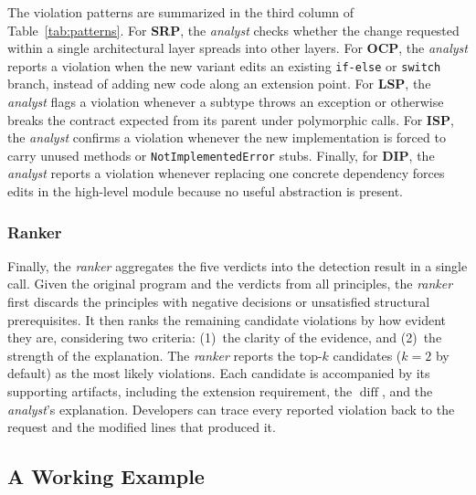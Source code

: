 \documentclass[sigconf,screen]{acmart}
\begin{document}
The violation patterns are summarized in the third column of Table~\ref{tab:patterns}.
For \textbf{SRP}, the \textit{analyst} checks whether the change requested within a single architectural layer spreads into other layers.
For \textbf{OCP}, the \textit{analyst} reports a violation when the new variant edits an existing \texttt{if-else} or \texttt{switch} branch, instead of adding new code along an extension point.
For \textbf{LSP}, the \textit{analyst} flags a violation whenever a subtype throws an exception or otherwise breaks the contract expected from its parent under polymorphic calls.
For \textbf{ISP}, the \textit{analyst} confirms a violation whenever the new implementation is forced to carry unused methods or \texttt{NotImplementedError} stubs.
Finally, for \textbf{DIP}, the \textit{analyst} reports a violation whenever replacing one concrete dependency forces edits in the high-level module because no useful abstraction is present.

\subsubsection{Ranker}
Finally, the \textit{ranker} aggregates the five verdicts into the detection result in a single call.
Given the original program and the verdicts from all principles, the \textit{ranker} first discards the principles with negative decisions or unsatisfied structural prerequisites.
It then ranks the remaining candidate violations by how evident they are, considering two criteria: (1)~the clarity of the evidence, and (2)~the strength of the explanation.
The \textit{ranker} reports the top-$k$ candidates ($k{=}2$ by default) as the most likely violations.
Each candidate is accompanied by its supporting artifacts, including the extension requirement, the $\operatorname{diff}$, and the \textit{analyst}'s explanation.
Developers can trace every reported violation back to the request and the modified lines that produced it.

\subsection{A Working Example}
\end{document}
